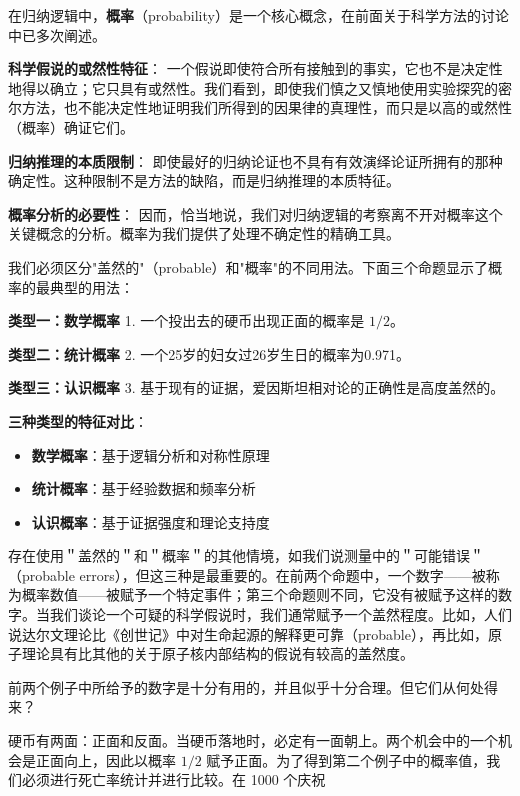 \begin{theorembox}[title=概率在归纳逻辑中的核心地位]
在归纳逻辑中，\textbf{概率}（probability）是一个核心概念，在前面关于科学方法的讨论中已多次阐述。

\textbf{科学假说的或然性特征}：
一个假说即使符合所有接触到的事实，它也不是决定性地得以确立；它只具有或然性。我们看到，即使我们慎之又慎地使用实验探究的密尔方法，也不能决定性地证明我们所得到的因果律的真理性，而只是以高的或然性（概率）确证它们。

\textbf{归纳推理的本质限制}：
即使最好的归纳论证也不具有有效演绎论证所拥有的那种确定性。这种限制不是方法的缺陷，而是归纳推理的本质特征。

\textbf{概率分析的必要性}：
因而，恰当地说，我们对归纳逻辑的考察离不开对概率这个关键概念的分析。概率为我们提供了处理不确定性的精确工具。
\end{theorembox}

\begin{examplebox}[title=概率概念的典型应用类型]
我们必须区分"盖然的"（probable）和"概率"的不同用法。下面三个命题显示了概率的最典型的用法：

\textbf{类型一：数学概率}
1. 一个投出去的硬币出现正面的概率是 $1/2$。

\textbf{类型二：统计概率}
2. 一个25岁的妇女过26岁生日的概率为0.971。

\textbf{类型三：认识概率}
3. 基于现有的证据，爱因斯坦相对论的正确性是高度盖然的。

\textbf{三种类型的特征对比}：
\begin{itemize}
\item \textbf{数学概率}：基于逻辑分析和对称性原理
\item \textbf{统计概率}：基于经验数据和频率分析
\item \textbf{认识概率}：基于证据强度和理论支持度
\end{itemize}
\end{examplebox}

存在使用＂盖然的＂和＂概率＂的其他情境，如我们说测量中的＂可能错误＂（probable errors），但这三种是最重要的。在前两个命题中，一个数字——被称为概率数值——被赋予一个特定事件；第三个命题则不同，它没有被赋予这样的数字。当我们谈论一个可疑的科学假说时，我们通常赋予一个盖然程度。比如，人们说达尔文理论比《创世记》中对生命起源的解释更可靠（probable），再比如，原子理论具有比其他的关于原子核内部结构的假说有较高的盖然度。

前两个例子中所给予的数字是十分有用的，并且似乎十分合理。但它们从何处得来？

硬币有两面：正面和反面。当硬币落地时，必定有一面朝上。两个机会中的一个机会是正面向上，因此以概率 $1 / 2$ 赋予正面。为了得到第二个例子中的概率值，我们必须进行死亡率统计并进行比较。在 1000 个庆祝

